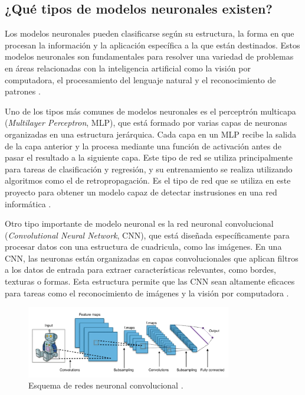 \subsection{¿Qué tipos de modelos neuronales existen?}

Los modelos neuronales pueden clasificarse según su estructura, la forma en que procesan la información y la aplicación específica a la que están destinados. Estos modelos neuronales son fundamentales para resolver una variedad de problemas en áreas relacionadas con la inteligencia artificial como la visión por computadora, el procesamiento del lenguaje natural y el reconocimiento de patrones \cite{bishop2006pattern}.

Uno de los tipos más comunes de modelos neuronales es el perceptrón multicapa (\textit{Multilayer Perceptron}, MLP), que está formado por varias capas de neuronas organizadas en una estructura jerárquica. Cada capa en un MLP recibe la salida de la capa anterior y la procesa mediante una función de activación antes de pasar el resultado a la siguiente capa. Este tipo de red se utiliza principalmente para tareas de clasificación y regresión, y su entrenamiento se realiza utilizando algoritmos como el de retropropagación. Es el tipo de red que se utiliza en este proyecto para obtener un modelo capaz de detectar instrusiones en una red informática \cite{goodfellow2016deep}.

Otro tipo importante de modelo neuronal es la red neuronal convolucional (\textit{Convolutional Neural Network}, CNN), que está diseñada específicamente para procesar datos con una estructura de cuadricula, como las imágenes. En una CNN, las neuronas están organizadas en capas convolucionales que aplican filtros a los datos de entrada para extraer características relevantes, como bordes, texturas o formas. Esta estructura permite que las CNN sean altamente eficaces para tareas como el reconocimiento de imágenes y la visión por computadora \cite{goodfellow2016deep}.


\begin{figure}[H]
    \centering
    \includegraphics[width=0.8\textwidth]{./img/modelo/CNN.png}
    \caption{Esquema de redes neuronal convolucional \cite{uniteai2020cnn}.}
    \label{fig:esq-CNN}
\end{figure}


